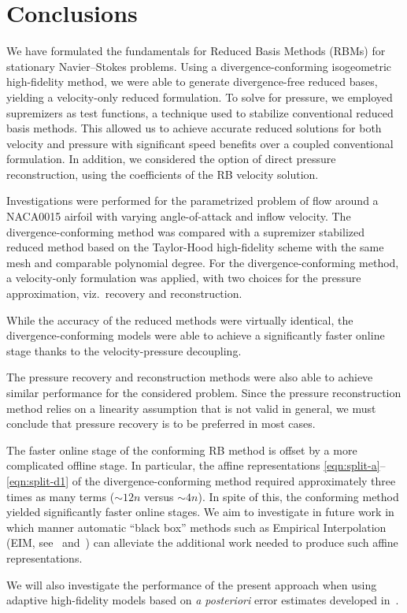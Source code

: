 \documentclass[onecolumn, twoside, a4paper, 11pt]{article}
\begin{document}
\clearpage

\section{Conclusions}
\label{sec:conc}

We have formulated the fundamentals for Reduced Basis Methods (RBMs) for stationary Navier--Stokes
problems. Using a divergence-conforming isogeometric high-fidelity method, we were able to generate
divergence-free reduced bases, yielding a velocity-only reduced formulation. To solve for pressure,
we employed supremizers as test functions, a technique used to stabilize conventional reduced basis
methods. This allowed us to achieve accurate reduced solutions for both velocity and pressure with
significant speed benefits over a coupled conventional formulation. In addition, we considered the
option of direct pressure reconstruction, using the coefficients of the RB velocity solution.

Investigations were performed for the parametrized problem of flow around a NACA0015 airfoil with
varying angle-of-attack and inflow velocity. The divergence-conforming method was compared with a
supremizer stabilized reduced method based on the Taylor-Hood high-fidelity scheme with the same
mesh and comparable polynomial degree. For the divergence-conforming method, a velocity-only
formulation was applied, with two choices for the pressure approximation, viz.~recovery and
reconstruction.

While the accuracy of the reduced methods were virtually identical, the divergence-conforming models
were able to achieve a significantly faster online stage thanks to the velocity-pressure decoupling.

The pressure recovery and reconstruction methods were also able to achieve similar performance for the
considered problem. Since the pressure reconstruction method relies on a linearity
assumption that is not valid in general, we must conclude that pressure
recovery is to be preferred in most cases.

The faster online stage of the conforming RB method is offset by a more complicated offline stage.
In particular, the affine
representations \eqref{eqn:split-a}--\eqref{eqn:split-d1} of the divergence-conforming method
required approximately three times as many terms (${\sim}12n$ versus ${\sim}4n$). In spite of this,
the conforming method yielded significantly faster online stages. We aim to investigate in future work
in which manner automatic ``black box'' methods such as Empirical Interpolation
(EIM, see~\cite{Barrault2004eim,Grepl2007erb,Maday2007gmi} and~\cite[Chapter 10]{Quarteroni2016rbm})
can alleviate the additional work needed to produce such affine representations.

We will also investigate the performance of the present approach when using adaptive high-fidelity
models based on \emph{a posteriori} error estimates developed in~\cite{Kumar2015sap,Kumar2017spr}.



\end{document}
